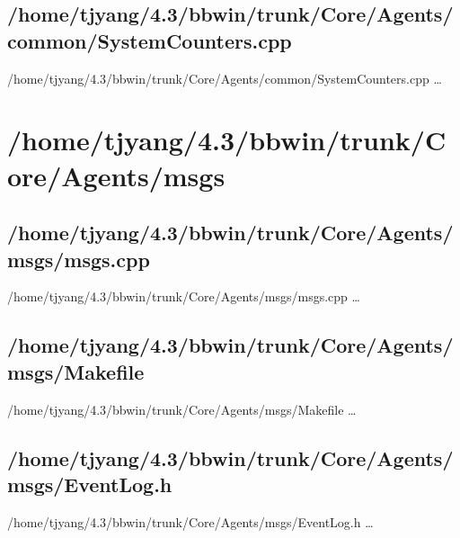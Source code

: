\subsection{/home/tjyang/4.3/bbwin/trunk/Core/Agents/common/SystemCounters.cpp}
\lstset{numberstyle=\tiny,numbers=left,
   breaklines=true,
   stepnumber=1,numbersep=5pt,firstnumber=1,
   xleftmargin=12pt,showstringspaces=false}
\noindent /home/tjyang/4.3/bbwin/trunk/Core/Agents/common/SystemCounters.cpp  \ldots



\section{/home/tjyang/4.3/bbwin/trunk/Core/Agents/msgs}



\subsection{/home/tjyang/4.3/bbwin/trunk/Core/Agents/msgs/msgs.cpp}
\lstset{numberstyle=\tiny,numbers=left,
   breaklines=true,
   stepnumber=1,numbersep=5pt,firstnumber=1,
   xleftmargin=12pt,showstringspaces=false}
\noindent /home/tjyang/4.3/bbwin/trunk/Core/Agents/msgs/msgs.cpp  \ldots



\subsection{/home/tjyang/4.3/bbwin/trunk/Core/Agents/msgs/Makefile}
\lstset{numberstyle=\tiny,numbers=left,
   breaklines=true,
   stepnumber=1,numbersep=5pt,firstnumber=1,
   xleftmargin=12pt,showstringspaces=false}
\noindent /home/tjyang/4.3/bbwin/trunk/Core/Agents/msgs/Makefile  \ldots



\subsection{/home/tjyang/4.3/bbwin/trunk/Core/Agents/msgs/EventLog.h}
\lstset{numberstyle=\tiny,numbers=left,
   breaklines=true,
   stepnumber=1,numbersep=5pt,firstnumber=1,
   xleftmargin=12pt,showstringspaces=false}
\noindent /home/tjyang/4.3/bbwin/trunk/Core/Agents/msgs/EventLog.h  \ldots



